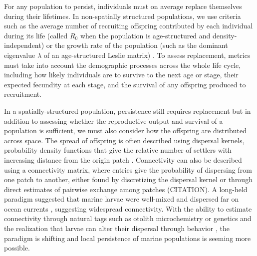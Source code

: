 \documentclass[12pt, oneside]{article}   	%
\begin{document}
For any population to persist, individuals must on average replace themselves during their lifetimes. In non-spatially structured populations, we use criteria such as the average number of recruiting offspring contributed by each individual during its life (called $R_0$ when the population is age-structured and density-independent) or the growth rate of the population (such as the dominant eigenvalue $\lambda$ of an age-structured Leslie matrix) \citep{caswell_matrix_2001, burgess2014beyond}. To assess replacement, metrics must take into account the demographic processes across the whole life cycle, including how likely individuals are to survive to the next age or stage, their expected fecundity at each stage, and the survival of any offspring produced to recruitment. %

In a spatially-structured population, persistence still requires replacement but in addition to assessing whether the reproductive output and survival of a population is sufficient, we must also consider how the offspring are distributed across space. The spread of offspring is often described using dispersal kernels, probability density functions that give the relative number of settlers with increasing distance from the origin patch \citep[e.g.][]{bode2018estimating}. Connectivity can also be described using a connectivity matrix, where entries give the probability of dispersing from one patch to another, either found by discretizing the dispersal kernel or through direct estimates of pairwise exchange among patches (CITATION). A long-held paradigm suggested that marine larvae were well-mixed and dispersed far on ocean currents \citep{roughgarden_recruitment_1988}, suggesting widespread connectivity. With the ability to estimate connectivity through natural tags such as otolith microchemistry or genetics and the realization that larvae can alter their dispersal through behavior \citep[e.g.][]{morgan_nearshore_2009}, the paradigm is shifting and local persistence of marine populations is seeming more possible. %
\end{document}
